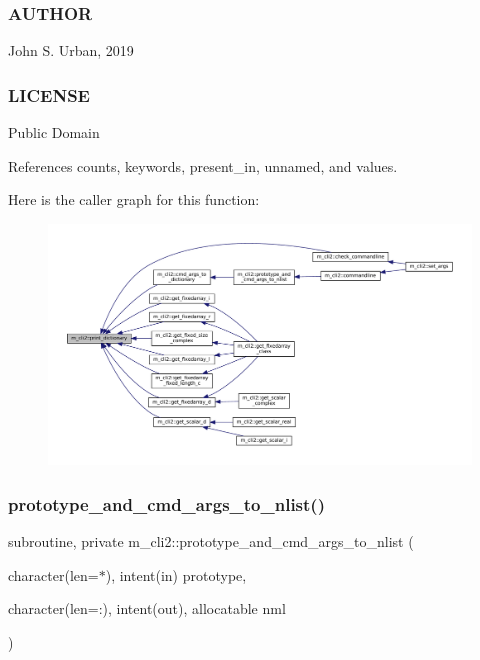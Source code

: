 \subsubsection*{A\+U\+T\+H\+OR}

John S. Urban, 2019 \subsubsection*{L\+I\+C\+E\+N\+SE}

Public Domain 

References counts, keywords, present\+\_\+in, unnamed, and values.

Here is the caller graph for this function\+:\nopagebreak
\begin{figure}[H]
\begin{center}
\leavevmode
\includegraphics[width=350pt]{namespacem__cli2_acbd726aa5c13b005a14c06d58915cb9a_icgraph}
\end{center}
\end{figure}
\mbox{\label{namespacem__cli2_a46f31858773ff1b4cf96329a14130bf2}} 
\subsubsection{\texorpdfstring{prototype\+\_\+and\+\_\+cmd\+\_\+args\+\_\+to\+\_\+nlist()}{prototype\_and\_cmd\_args\_to\_nlist()}}
{\footnotesize\ttfamily subroutine, private m\+\_\+cli2\+::prototype\+\_\+and\+\_\+cmd\+\_\+args\+\_\+to\+\_\+nlist (\begin{DoxyParamCaption}\item[{character(len=$\ast$), intent(in)}]{prototype,  }\item[{character(len=\+:), intent(out), allocatable}]{nml }\end{DoxyParamCaption})\hspace{0.3cm}{\ttfamily [private]}}



